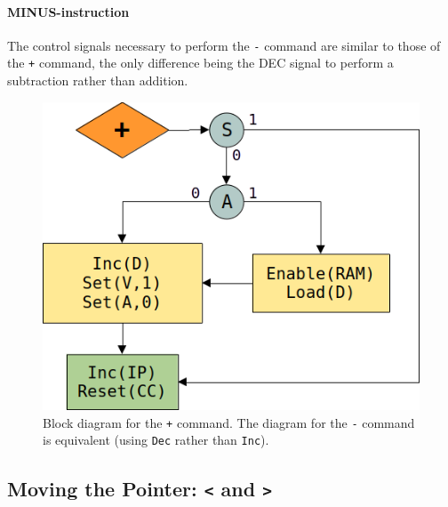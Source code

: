 \documentclass{article}
\begin{document}
\paragraph{MINUS-instruction} The control signals necessary to perform the \texttt{-} command are similar to those of the \texttt{+} command, the only difference being the DEC signal to perform a subtraction rather than addition.


\begin{figure}[H]
  \centering
  \includegraphics[scale=0.3]{img/plusalg}
  \caption{Block diagram for the \texttt{+} command. The diagram for the \texttt{-} command is equivalent (using \texttt{Dec} rather than \texttt{Inc}).}
  \label{fig:plusalg}
\end{figure}

\subsection{Moving the Pointer: \texttt{<} and \texttt{>}} \label{sec:sequences:<>}
\end{document}
